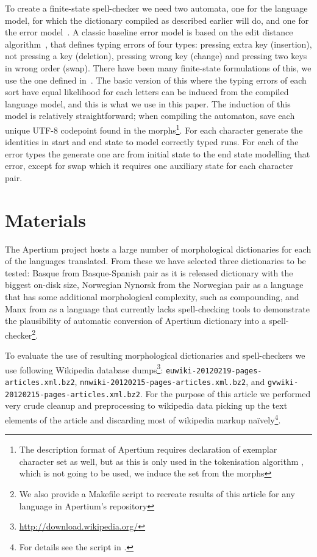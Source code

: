 \documentclass[a4paper]{article}
\begin{document}
To create a finite-state spell-checker we need two automata, one for the language
model, for which the dictionary compiled as described earlier will do, and one for the
error model~\cite{pirinen/2010/lrec}. A classic baseline error model is based
on the edit distance algorithm~\cite{levenshtein/1966,damerau/1964}, that
defines typing errors of four types: pressing extra key (insertion), not
pressing a key (deletion), pressing wrong key (change) and pressing two keys in
wrong order (swap). There have been many finite-state formulations of this, we
use the one defined in~\cite{schulz/2002,pirinen/2010/lrec}. The basic version
of this where the typing errors of each sort have equal likelihood for each
letters can be induced from the compiled language model, and this is what we
use in this paper. The induction of this model is relatively straightforward;
when compiling the automaton, save each unique UTF-8 codepoint found in the
morphs\footnote{The description format of Apertium requires declaration of
exemplar character set as well, but as this is only used in the tokenisation algorithm \cite{garrido-alenda02}
, which is not going to be used, we induce the set from the morphs}. For each 
character generate the identities in
start and end state to model correctly typed runs. For each of the error types
the generate one arc from initial state to the end state modelling that error,
except for swap which it requires one auxiliary state for each character pair.

\section{Materials}
\label{sec:materials}

The Apertium project hosts a large number of morphological dictionaries for
each of the languages translated. From these we have selected three
dictionaries to be tested: Basque from Basque-Spanish pair as it is 
released dictionary with the biggest on-disk size, Norwegian Nynorsk from the Norwegian pair as a language
that has some additional morphological complexity, such as compounding, and
Manx from  as a language that currently lacks spell-checking tools to
demonstrate the plausibility of automatic conversion of Apertium dictionary
into a spell-checker\footnote{We also provide a Makefile script to
recreate results of this article for any language in Apertium's repository}.

To evaluate the use of resulting morphological dictionaries and spell-checkers
we use following Wikipedia database 
dumps\footnote{\url{http://download.wikipedia.org/}}: 
\texttt{euwiki-20120219-pages-articles.xml.bz2}, 
\texttt{nnwiki-20120215-pages-articles.xml.bz2},
and \texttt{gvwiki-20120215-pages-articles.xml.bz2}. For the purpose of this
article we performed very crude cleanup and preprocessing to wikipedia data
picking up the text elements of the article and discarding most of wikipedia
markup naïvely\footnote{For details see the script in .}.
\end{document}
